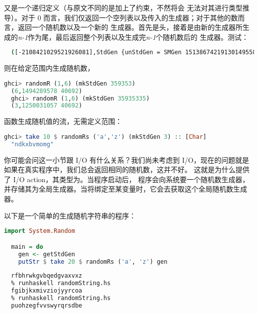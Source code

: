 \documentclass[./main.tex]{subfiles}
\begin{document}
又是一个递归定义（与原文不同的是加上了约束，不然将会
无法对其进行类型推导）。对于 0 而言，我们仅返回一个空列表以及传入的生成器；对于其他的数而言，返回一个随机数以及一个新的
生成器。首先是头，接着是由新的生成器所生成的\textit{n-1}作为尾，最后返回整个列表以及生成完\textit{n-1}个随机数后的
生成器。测试：

\begin{lstlisting}[language=Bash]
  % runhaskell ownRandom.hs 1 2
  ([-2108421029521926081],StdGen {unStdGen = SMGen 15138674219130149558 10905525725756348111})
\end{lstlisting}

则在给定范围内生成随机数，

\begin{lstlisting}[language=Haskell]
  ghci> randomR (1,6) (mkStdGen 359353)
  (6,1494289578 40692)
  ghci> randomR (1,6) (mkStdGen 35935335)
  (3,1250031057 40692)
\end{lstlisting}

函数生成随机值的流，无需定义范围：

\begin{lstlisting}[language=Haskell]
  ghci> take 10 $ randomRs ('a','z') (mkStdGen 3) :: [Char]
  "ndkxbvmomg"
\end{lstlisting}

你可能会问这一小节跟 I/O 有什么关系？我们尚未考虑到 I/O，现在的问题就是如果在真实程序中，我们总会返回相同的随机数，这并不好。
这就是为什么提供了 I/O action，其类型为。当程序启动后，
程序会向系统要一个随机数生成器，并存储其为全局生成器。当将绑定至某变量时，它会去获取这个全局随机数生成器。

以下是一个简单的生成随机字符串的程序：

\begin{lstlisting}[language=Haskell]
  import System.Random

  main = do
    gen <- getStdGen
    putStr $ take 20 $ randomRs ('a', 'z') gen
\end{lstlisting}

\begin{lstlisting}[language=Bash]
  % runhaskell randomString.hs
  rfbhrwkgvbqedgvaxvxz
  % runhaskell randomString.hs
  fgibjkxmivziojyyrcoa
  % runhaskell randomString.hs
  puohzegfvvswyrqrsdbe
\end{lstlisting}
\end{document}
